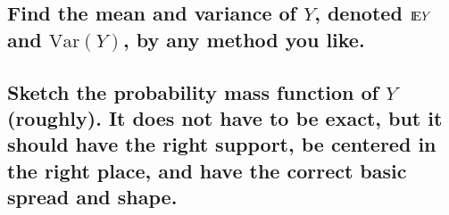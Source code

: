 \documentclass[11pt]{article}
\begin{document}
\subsubsection[]{}
\label{sec-2-1-1}
\vspace{0.5in}
\subsection[Find the mean and variance of \(Y\), denoted \(\E Y\) and \(\mathrm{Var}(Y)\), by any method you like.]{Find the mean and variance of \(Y\), denoted \(\E Y\) and \(\mathrm{Var}(Y)\), by any method you like.}
\label{sec-2-2}
\subsubsection[]{}
\label{sec-2-2-1}
\vspace{0.5in}
\subsection[Sketch the probability mass function of \(Y\) (roughly). It does not have to be exact, but it should have the right support, be centered in the right place, and have the correct basic spread and shape.]{Sketch the probability mass function of \(Y\) (roughly). It does not have to be exact, but it should have the right support, be centered in the right place, and have the correct basic spread and shape.}
\label{sec-2-3}

\subsubsection[]{}
\label{sec-2-3-1}
\vspace{1in}
\end{document}
